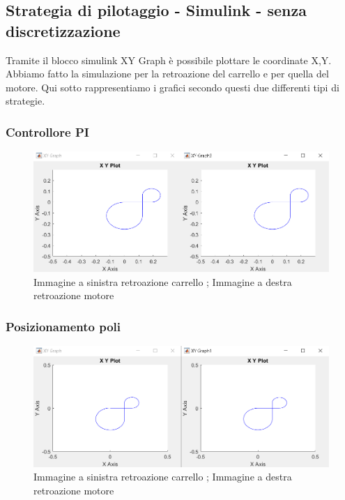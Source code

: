 \documentclass{article}
\begin{document}
\subsection{Strategia di pilotaggio - Simulink - senza discretizzazione}
Tramite il blocco simulink XY Graph è possibile plottare le coordinate X,Y. Abbiamo fatto la simulazione per la retroazione del carrello e per quella del motore.
Qui sotto rappresentiamo i grafici secondo questi due differenti tipi di strategie.

\subsubsection{Controllore PI}

\begin{figure}[H]
\centering
\includegraphics[width=.9\textwidth]{./strategia_sim/PIcon.png}
\caption{ Immagine a sinistra retroazione carrello ; Immagine a destra retroazione motore }
\end{figure}

\subsubsection{Posizionamento poli}
\begin{figure}[H]
\centering
\includegraphics[width=.9\textwidth]{./strategia_sim/pospolcon.png}
\caption{ Immagine a sinistra retroazione carrello ; Immagine a destra retroazione motore }
\end{figure}
\end{document}
